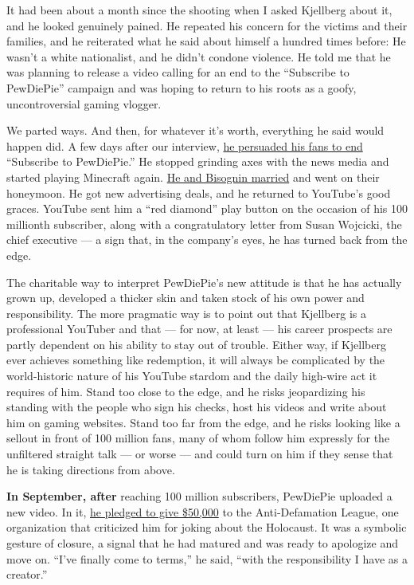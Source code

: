 It had been about a month since the shooting when I asked Kjellberg
about it, and he looked genuinely pained. He repeated his concern for
the victims and their families, and he reiterated what he said about
himself a hundred times before: He wasn't a white nationalist, and he
didn't condone violence. He told me that he was planning to release a
video calling for an end to the ``Subscribe to PewDiePie'' campaign and
was hoping to return to his roots as a goofy, uncontroversial gaming
vlogger.

We parted ways. And then, for whatever it's worth, everything he said
would happen did. A few days after our interview,
\href{https://www.youtube.com/watch?v=Ah5MYGQBYRo}{he persuaded his fans
to end} ``Subscribe to PewDiePie.'' He stopped grinding axes with the
news media and started playing Minecraft again.
\href{https://www.cnn.com/2019/08/20/entertainment/pewdiepie-and-marzia-bisognin-marry-trnd/index.html}{He
and Bisognin married} and went on their honeymoon. He got new
advertising deals, and he returned to YouTube's good graces. YouTube
sent him a ``red diamond'' play button on the occasion of his 100
millionth subscriber, along with a congratulatory letter from Susan
Wojcicki, the chief executive --- a sign that, in the company's eyes, he
has turned back from the edge.

The charitable way to interpret PewDiePie's new attitude is that he has
actually grown up, developed a thicker skin and taken stock of his own
power and responsibility. The more pragmatic way is to point out that
Kjellberg is a professional YouTuber and that --- for now, at least ---
his career prospects are partly dependent on his ability to stay out of
trouble. Either way, if Kjellberg ever achieves something like
redemption, it will always be complicated by the world-historic nature
of his YouTube stardom and the daily high-wire act it requires of him.
Stand too close to the edge, and he risks jeopardizing his standing with
the people who sign his checks, host his videos and write about him on
gaming websites. Stand too far from the edge, and he risks looking like
a sellout in front of 100 million fans, many of whom follow him
expressly for the unfiltered straight talk --- or worse --- and could
turn on him if they sense that he is taking directions from above.

\textbf{In September, after} reaching 100 million subscribers, PewDiePie
uploaded a new video. In it,
\href{https://www.theverge.com/2019/9/11/20860553/pewdiepie-felix-kjellberg-adl-donation-anti-defamation-league-conspiracy-theories-50000}{he
pledged to give \$50,000} to the Anti-Defamation League, one
organization that criticized him for joking about the Holocaust. It was
a symbolic gesture of closure, a signal that he had matured and was
ready to apologize and move on. ``I've finally come to terms,'' he said,
``with the responsibility I have as a creator.''

